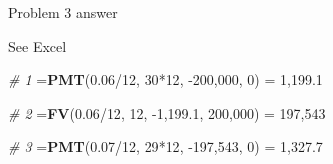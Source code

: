 \documentclass[ignorenonframetext,]{beamer}
\newenvironment{Shaded}{\begin{snugshade}}{\end{snugshade}}
\newcommand{\KeywordTok}[1]{\textcolor[rgb]{0.13,0.29,0.53}{\textbf{{#1}}}}
\newcommand{\DecValTok}[1]{\textcolor[rgb]{0.00,0.00,0.81}{{#1}}}
\newcommand{\FloatTok}[1]{\textcolor[rgb]{0.00,0.00,0.81}{{#1}}}
\newcommand{\StringTok}[1]{\textcolor[rgb]{0.31,0.60,0.02}{{#1}}}
\newcommand{\CommentTok}[1]{\textcolor[rgb]{0.56,0.35,0.01}{\textit{{#1}}}}
\newcommand{\NormalTok}[1]{{#1}}
\begin{document}
\begin{frame}[fragile]{Problem 3 answer}

\begin{Shaded}
\begin{Highlighting}[]
\NormalTok{See Excel}

\CommentTok{# 1}
\NormalTok{=}\KeywordTok{PMT}\NormalTok{(}\FloatTok{0.06}\NormalTok{/}\DecValTok{12}\NormalTok{, }\DecValTok{30}\NormalTok{*}\DecValTok{12}\NormalTok{, -}\DecValTok{200}\NormalTok{,}\DecValTok{000}\NormalTok{, }\DecValTok{0}\NormalTok{) =}\StringTok{ }\DecValTok{1}\NormalTok{,}\FloatTok{199.1}

\CommentTok{# 2}
\NormalTok{=}\KeywordTok{FV}\NormalTok{(}\FloatTok{0.06}\NormalTok{/}\DecValTok{12}\NormalTok{, }\DecValTok{12}\NormalTok{, -}\DecValTok{1}\NormalTok{,}\FloatTok{199.1}\NormalTok{, }\DecValTok{200}\NormalTok{,}\DecValTok{000}\NormalTok{) =}\StringTok{ }\DecValTok{197}\NormalTok{,}\DecValTok{543}

\CommentTok{# 3}
\NormalTok{=}\KeywordTok{PMT}\NormalTok{(}\FloatTok{0.07}\NormalTok{/}\DecValTok{12}\NormalTok{, }\DecValTok{29}\NormalTok{*}\DecValTok{12}\NormalTok{, -}\DecValTok{197}\NormalTok{,}\DecValTok{543}\NormalTok{, }\DecValTok{0}\NormalTok{) =}\StringTok{ }\DecValTok{1}\NormalTok{,}\FloatTok{327.7}
\end{Highlighting}
\end{Shaded}

\end{frame}
\end{document}
